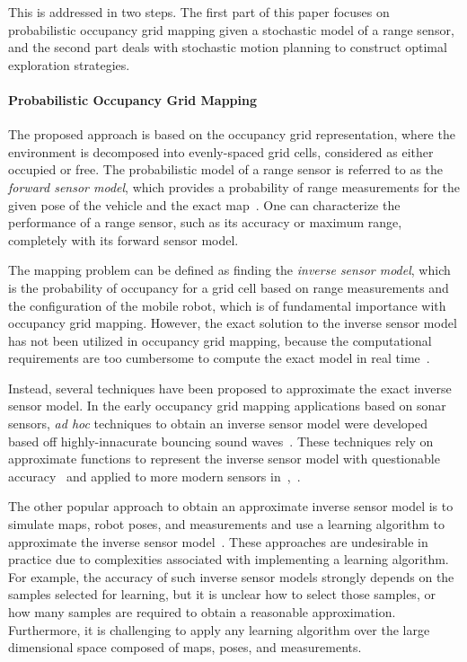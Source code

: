 \documentclass[smallextended]{svjour3}       %
\begin{document}
This is addressed in two steps. The first part of this paper focuses on probabilistic occupancy grid mapping given a stochastic model of a range sensor, and the second part deals with stochastic motion planning to construct optimal exploration strategies. 

\paragraph{Probabilistic Occupancy Grid Mapping}

The proposed approach is based  on the occupancy grid representation, where the environment is decomposed into evenly-spaced grid cells, considered as either occupied or free. The probabilistic model of a range sensor is referred to as the \textit{forward sensor model}, which provides a probability of range measurements for the given pose of the vehicle and the exact map~\cite{ThrBurFox05}. One can characterize the performance of a range sensor, such as its accuracy or maximum range, completely with its forward sensor model. 

The mapping problem can be defined as finding the \emph{inverse sensor model}, which is the probability of occupancy for a grid cell based on range measurements and the configuration of the mobile robot, which is of fundamental importance with occupancy grid mapping. However, the exact solution to the inverse sensor model has not been utilized in occupancy grid mapping, because the computational requirements are too cumbersome to compute the exact model in real time~\cite{ThrBurFox05}.

Instead, several techniques have been proposed to approximate the exact inverse sensor model. %
In the early occupancy grid mapping applications based on sonar sensors, \emph{ad hoc} techniques to obtain an inverse sensor model were developed based off highly-innacurate bouncing sound waves~\cite{MorElf85,Elf89}.
These techniques rely on approximate functions to represent the inverse sensor model with questionable accuracy~\cite{ChoLynHutKanBurKavThr05} and applied to more modern sensors in~\cite{And09},~\cite{PirRutBisSch11}.

The other popular approach to obtain an approximate inverse sensor model is to simulate maps, robot poses, and measurements and use a learning algorithm to approximate the inverse sensor model~\cite{ThrBurFox05,Thr01}. These approaches are undesirable in practice due to complexities associated with implementing a learning algorithm. For example, the accuracy of such inverse sensor models strongly depends on the samples selected for learning, but it is unclear how to select those samples, or how many samples are required to obtain a reasonable approximation. Furthermore, it is challenging to apply any learning algorithm over the large dimensional space composed of maps, poses, and measurements. 
\end{document}
